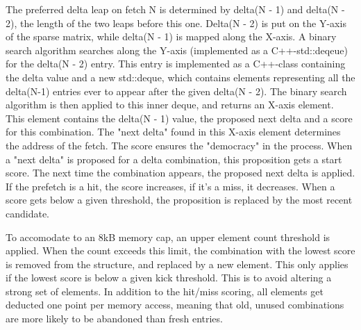 The preferred delta leap on fetch N is determined by delta(N - 1) and delta(N - 2), the length of the two leaps before this one. Delta(N - 2) is put on the Y-axis of the sparse matrix, while delta(N - 1) is mapped along the X-axis. A binary search algorithm searches along the Y-axis (implemented as a C++-std::deqeue) for the delta(N - 2) entry. This entry is implemented as a C++-class containing the delta value and a new std::deque, which contains elements representing all the delta(N-1) entries ever to appear after the given delta(N - 2). The binary search algorithm is then applied to this inner deque, and returns an X-axis element. This element contains the delta(N - 1) value, the proposed next delta and a score for this combination. The "next delta" found in this X-axis element determines the address of the fetch. The score ensures the "democracy" in the process. When a "next delta" is proposed for a delta combination, this proposition gets a start score. The next time the combination appears, the proposed next delta is applied. If the prefetch is a hit, the score increases, if it's a miss, it decreases. When a score gets below a given threshold, the proposition is replaced by the most recent candidate. 

To accomodate to an 8kB memory cap, an upper element count threshold is applied. When the count exceeds this limit, the combination with the lowest score is removed from the structure, and replaced by a new element. This only applies if the lowest score is below a given kick threshold. This is to avoid altering a strong set of elements. In addition to the hit/miss scoring, all elements get deducted one point per memory access, meaning that old, unused combinations are more likely to be abandoned than fresh entries.


